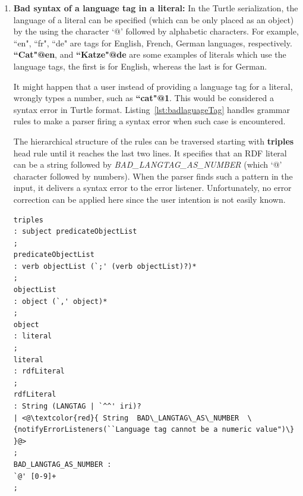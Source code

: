 \begin{enumerate}
\begin{lstlisting}[label=lst:MissuseAex ,  caption={Grammar rules for detecting misuse of `A' as a predicate instead of `a'.}] 
statement
: directive
| triples `.'
;
triples
: subject predicateObjectList
;
predicateObjectList
: verb objectList (`;' (verb objectList)?)*
;
verb
:`a'
| <@\textcolor{red}{`A' \{notifyErrorListeners(```A' cannot be used as predicate,         }@> 
<@\textcolor{red}{
it should be replaced with `a'")\}} @>
;
\end{lstlisting}

\item \textbf{Bad syntax of a language tag in a literal:} 
In the Turtle serialization, the language of a literal can be specified (which can be only placed as an object) by the using the character `@' followed by alphabetic characters. For example, ``en", ``fr", ``de" are tags for English, French, German languages, respectively. 
\textbf{``Cat"@en}, and \textbf{``Katze"@de} are some examples of literals which use the language tags, the first is for English, whereas the last is for German. 


It might happen that a user instead of providing a language tag for a literal, wrongly types a number, such as \textbf{``cat"@1}.
This would be considered a syntax error in Turtle format. 
Listing~\ref{lst:badlaguageTag} handles grammar rules to make a parser firing a syntax error when such case is encountered. 

The hierarchical structure of the rules can be traversed starting with \textbf{triples} head rule until it reaches the last two lines.
It specifies that an RDF literal can be a string followed by \emph{BAD\_LANGTAG\_AS\_NUMBER} (which `@' character followed by numbers). 
When the parser finds such a pattern in the input, it delivers a syntax error to the error listener. 
Unfortunately, no error correction can be applied here since the user intention is not easily known.  

\begin{lstlisting}[label=lst:badlaguageTag,  caption={Grammar rules for detecting incorrect language tag with a number instead of characters.}] 
triples
: subject predicateObjectList
;
predicateObjectList
: verb objectList (`;' (verb objectList)?)*
;
objectList
: object (`,' object)*
;
object
: literal
;
literal
: rdfLiteral
;
rdfLiteral
: String (LANGTAG | `^^' iri)?
| <@\textcolor{red}{ String  BAD\_LANGTAG\_AS\_NUMBER  \{notifyErrorListeners(``Language tag cannot be a numeric value")\} }@>
;
BAD_LANGTAG_AS_NUMBER : 
`@' [0-9]+
;
\end{lstlisting}
\end{enumerate}
